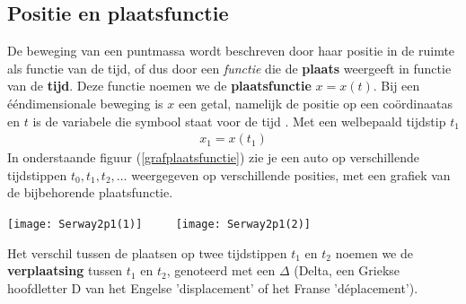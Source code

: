 \documentclass{ximera}
\begin{document}
	\author{Bart Lambregs}
    \xmsource\xmuitleg



	\subsection*{Positie en plaatsfunctie}

	De beweging van een puntmassa wordt beschreven door haar positie in de ruimte als functie van de tijd, of dus door een \textit{functie} die de \textbf{plaats} weergeeft in functie van de \textbf{tijd}. Deze functie noemen we de \textbf{plaatsfunctie} $x = x(t)$. 
	Bij een ééndimensionale beweging is $x$ een getal, namelijk de positie op een coördinaatas
	en $t$ is de variabele die symbool staat voor de tijd
	. 
	Met een welbepaald tijdstip $t_1$ 
	\begin{eqnarray*}
	x_1=x(t_1)
	\end{eqnarray*}
	In onderstaande figuur (\ref{grafplaatsfunctie}) zie je een auto op verschillende tijdstippen $t_0,t_1, t_2,\ldots$ weer\-ge\-ge\-ven op verschillende posities, met een grafiek van de bijbehorende plaatsfunctie.
	
	\begin{image}
	\texttt{[image: Serway2p1(1)]}
	$\qquad$   %
	\texttt{[image: Serway2p1(2)]}
	\end{image}
	
	Het verschil tussen de plaatsen op twee tijdstippen $t_1$ en $t_2$ noemen we de \textbf{verplaatsing} tussen $t_1$ en $t_2$, genoteerd met een $\Delta$ (Delta, een Griekse hoofdletter D  van het Engelse 'displacement' of het Franse 'déplacement').
\end{document}
